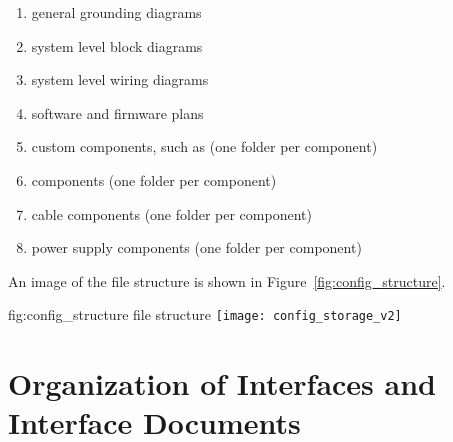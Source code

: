 \begin{enumerate}
\begin{enumerate}
   \item general grounding diagrams
   \item system level block diagrams
   \item system level wiring diagrams
   \item software and firmware plans
   \item custom components, such as  (one folder per component)
   \item {} components (one folder per component)
   \item cable components (one folder per component)
   \item power supply components (one folder per component)
 \end{enumerate}
\end{enumerate}
An image of the  file structure is shown in
Figure~\ref{fig:config_structure}.
\begin{dunefigure}{fig:config_structure}
  { file structure}
  \texttt{[image: config\_storage\_v2]}
\end{dunefigure}

\section{Organization of Interfaces and Interface Documents}
\label{sec:fdsp-coord-integ-interface}

